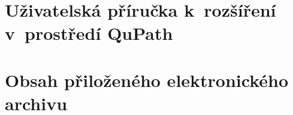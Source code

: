 \documentclass[czech, bc, kky, he, iso690alph, pdf]{fasthesis}
\begin{document}
\chapter{Uživatelská příručka k~rozšíření v~prostředí QuPath}

\chapter{Obsah přiloženého elektronického archivu}

%
\backmatter

\printbibliography

\backpage
\end{document}
